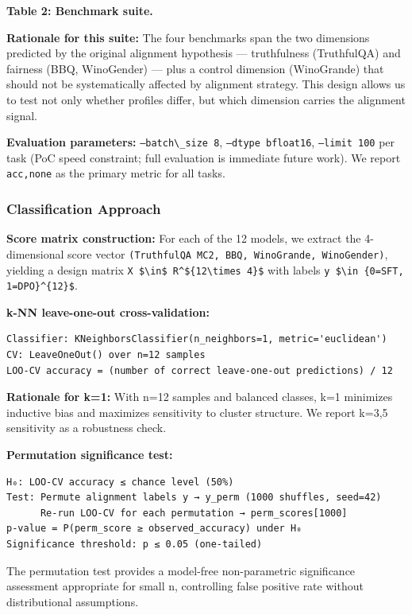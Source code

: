 \textbf{Table 2: Benchmark suite.}

\textbf{Rationale for this suite:} The four benchmarks span the two dimensions predicted by
the original alignment hypothesis --- truthfulness (TruthfulQA) and fairness (BBQ,
WinoGender) --- plus a control dimension (WinoGrande) that should not be systematically
affected by alignment strategy. This design allows us to test not only whether profiles
differ, but which dimension carries the alignment signal.

\textbf{Evaluation parameters:} \texttt{--batch\textbackslash \_size 8}, \texttt{--dtype bfloat16}, \texttt{--limit 100} per
task (PoC speed constraint; full evaluation is immediate future work). We report
\texttt{acc,none} as the primary metric for all tasks.

\subsubsection{Classification Approach}

\textbf{Score matrix construction:} For each of the 12 models, we extract the 4-dimensional
score vector \texttt{(TruthfulQA MC2, BBQ, WinoGrande, WinoGender)}, yielding a design matrix
\texttt{X \$\textbackslash in\$ R\^{}\$\{12\textbackslash times 4\}\$} with labels \texttt{y \$\textbackslash in \{0=SFT, 1=DPO\}\^{}\{12\}\$}.

\textbf{k-NN leave-one-out cross-validation:}

\begin{verbatim}
Classifier: KNeighborsClassifier(n_neighbors=1, metric='euclidean')
CV: LeaveOneOut() over n=12 samples
LOO-CV accuracy = (number of correct leave-one-out predictions) / 12
\end{verbatim}

\textbf{Rationale for k=1:} With n=12 samples and balanced classes, k=1 minimizes inductive
bias and maximizes sensitivity to cluster structure. We report k=3,5 sensitivity as
a robustness check.

\textbf{Permutation significance test:}

\begin{verbatim}
H₀: LOO-CV accuracy ≤ chance level (50%)
Test: Permute alignment labels y → y_perm (1000 shuffles, seed=42)
      Re-run LOO-CV for each permutation → perm_scores[1000]
p-value = P(perm_score ≥ observed_accuracy) under H₀
Significance threshold: p ≤ 0.05 (one-tailed)
\end{verbatim}

The permutation test provides a model-free non-parametric significance assessment
appropriate for small n, controlling false positive rate without distributional
assumptions.

